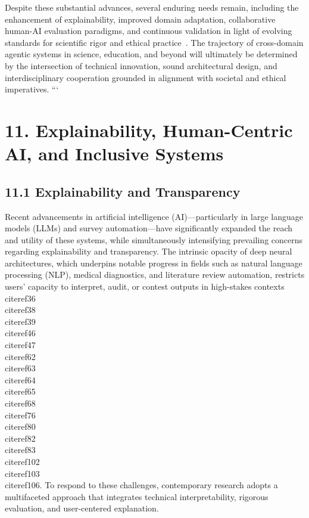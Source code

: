\documentclass[11pt]{article}
\begin{document}
Despite these substantial advances, several enduring needs remain, including the enhancement of explainability, improved domain adaptation, collaborative human-AI evaluation paradigms, and continuous validation in light of evolving standards for scientific rigor and ethical practice~\cite{ref30,ref45,ref86,ref99,ref100,ref104,ref110,ref111,ref113,ref114,ref115}. The trajectory of cross-domain agentic systems in science, education, and beyond will ultimately be determined by the intersection of technical innovation, sound architectural design, and interdisciplinary cooperation grounded in alignment with societal and ethical imperatives.
```

\section{11. Explainability, Human-Centric AI, and Inclusive Systems}

\subsection{11.1 Explainability and Transparency}

Recent advancements in artificial intelligence (AI)—particularly in large language models (LLMs) and survey automation—have significantly expanded the reach and utility of these systems, while simultaneously intensifying prevailing concerns regarding explainability and transparency. The intrinsic opacity of deep neural architectures, which underpins notable progress in fields such as natural language processing (NLP), medical diagnostics, and literature review automation, restricts users’ capacity to interpret, audit, or contest outputs in high-stakes contexts \\cite{ref36}\\cite{ref38}\\cite{ref39}\\cite{ref46}\\cite{ref47}\\cite{ref62}\\cite{ref63}\\cite{ref64}\\cite{ref65}\\cite{ref68}\\cite{ref76}\\cite{ref80}\\cite{ref82}\\cite{ref83}\\cite{ref102}\\cite{ref103}\\cite{ref106}. To respond to these challenges, contemporary research adopts a multifaceted approach that integrates technical interpretability, rigorous evaluation, and user-centered explanation.
\end{document}
